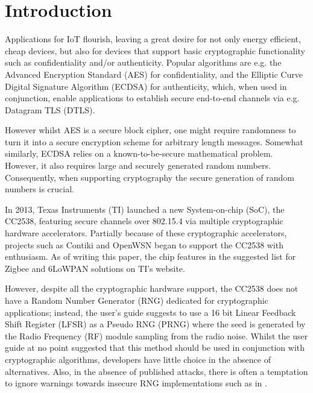 \section{Introduction}
Applications for IoT flourish, leaving a great desire for not only energy efficient, cheap devices, but also for devices that support basic cryptographic functionality such as confidentiality and/or authenticity. Popular algorithms are e.g. the Advanced Encryption Standard\cite{AES} (AES) for confidentiality, and the Elliptic Curve Digital Signature Algorithm\cite{ECDSA} (ECDSA) for authenticity, which, when used in conjunction, enable applications to establish secure end-to-end channels via e.g. Datagram TLS\cite{DTLS} (DTLS). 

However whilst AES is a secure block cipher, one might require randomness to turn it into a secure encryption scheme for arbitrary length messages. Somewhat similarly, ECDSA relies on a known-to-be-secure mathematical problem. However, it also requires large and securely generated random numbers. Consequently, when supporting cryptography the secure generation of random numbers is crucial. 


In 2013, Texas Instruments (TI) launched a new System-on-chip (SoC), the CC2538\cite{CC2538}, featuring secure channels over 802.15.4 via multiple cryptographic hardware accelerators. Partially because of these cryptographic accelerators, projects such as Contiki\cite{Contiki} and OpenWSN\cite{OpenWSN} began to support the CC2538 with enthusiasm. As of writing this paper, the chip features in the suggested list for Zigbee and 6LoWPAN solutions on TI's website\cite{ZigbeeProducts}.

However, despite all the cryptographic hardware support, the CC2538 does not have a Random Number Generator (RNG) dedicated for cryptographic applications; instead, the user's guide suggests to use a 16 bit Linear Feedback Shift Register (LFSR) as a Pseudo RNG (PRNG) where the seed is generated by the Radio Frequency (RF) module sampling from the radio noise. Whilst the user guide at no point suggested that this method should be used in conjunction with cryptographic algorithms, developers have little choice in the absence of alternatives. Also, in the absence of published attacks, there is often a temptation to ignore warnings towards insecure RNG implementations such as in \cite{SmartMeterBlog}. 

